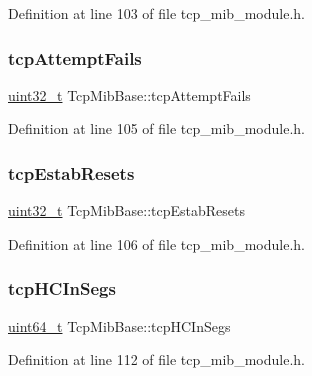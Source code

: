 Definition at line 103 of file tcp\+\_\+mib\+\_\+module.\+h.

\mbox{\label{structTcpMibBase_a0633da2571e01256a93178192113bb13}} 
\subsubsection{\texorpdfstring{tcp\+Attempt\+Fails}{tcpAttemptFails}}
{\footnotesize\ttfamily \hyperlink{stdint_8h_a435d1572bf3f880d55459d9805097f62}{uint32\+\_\+t} Tcp\+Mib\+Base\+::tcp\+Attempt\+Fails}



Definition at line 105 of file tcp\+\_\+mib\+\_\+module.\+h.

\mbox{\label{structTcpMibBase_a1f6727e57c7a4a57e725d8d1ef19966b}} 
\subsubsection{\texorpdfstring{tcp\+Estab\+Resets}{tcpEstabResets}}
{\footnotesize\ttfamily \hyperlink{stdint_8h_a435d1572bf3f880d55459d9805097f62}{uint32\+\_\+t} Tcp\+Mib\+Base\+::tcp\+Estab\+Resets}



Definition at line 106 of file tcp\+\_\+mib\+\_\+module.\+h.

\mbox{\label{structTcpMibBase_a11fe74994b0d0ec594f6ccd9267e9131}} 
\subsubsection{\texorpdfstring{tcp\+H\+C\+In\+Segs}{tcpHCInSegs}}
{\footnotesize\ttfamily \hyperlink{stdint_8h_aec6fcb673ff035718c238c8c9d544c47}{uint64\+\_\+t} Tcp\+Mib\+Base\+::tcp\+H\+C\+In\+Segs}



Definition at line 112 of file tcp\+\_\+mib\+\_\+module.\+h.

